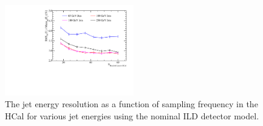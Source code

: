 \begin{figure}
\centering
\includegraphics[width=0.5\textwidth]{OptimisationStudies/Plots/JetEnergyResolutions/JER_vs_NumberOfLayersInTheHCal.pdf}
\caption[The jet energy resolution as a function of sampling frequency in the HCal for various jet energies using the nominal ILD detector model.]{The jet energy resolution as a function of sampling frequency in the HCal for various jet energies using the nominal ILD detector model.}
\label{fig:hcalnlayers}
\end{figure}

